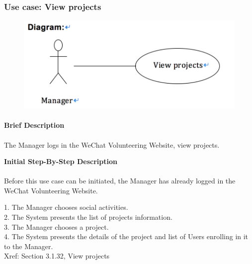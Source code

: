 \documentclass[12pt]{report}
\begin{document}
\newpage
\subsubsection{Use case:  View projects }

\begin{figure}[!htb]
  \includegraphics{218.PNG}
\end{figure}
\paragraph{}
\begin{flushleft}
\textbf{Brief Description }
\paragraph{}
The Manager logs in the WeChat Volunteering Website, view projects.\\

\begin{flushleft}
\textbf{Initial Step-By-Step Description }
\paragraph{}
Before this use case can be initiated, the Manager has already logged in the WeChat Volunteering Website.

\begin{flushleft}
1.	The Manager chooses social activities. \\
2.	The System presents the list of projects information. \\
3.	The Manager chooses a project. \\
4.	The System presents the details of the project and list of Users enrolling in it to the Manager.\\
Xref: Section 3.1.32, View projects
\end{flushleft}
\end{flushleft}
\end{flushleft}
\end{document}
